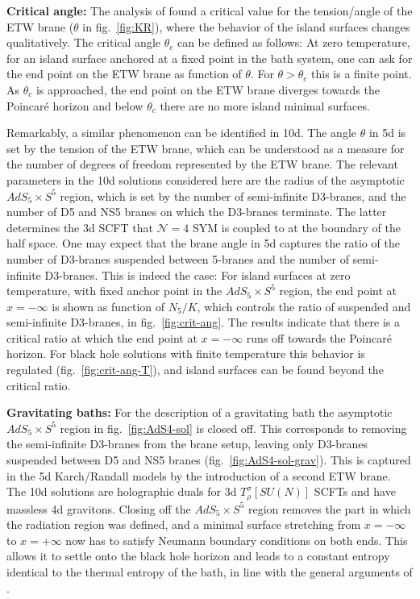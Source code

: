 \documentclass[aps,prd,11pt,notitlepage,longbibliography,nofootinbib,tightenlines,preprintnumbers]{revtex4-1}
\begin{document}
\medskip
\textbf{Critical angle:}
The analysis of  \cite{Geng:2020fxl} found a critical value for the tension/angle of the ETW brane ($\theta$ in fig.~\ref{fig:KR}), where the behavior of the island surfaces changes qualitatively.
%
The critical angle $\theta_c$ can be defined as follows:
At zero temperature, for an island surface anchored at a fixed point in the bath system, one can ask for the end point on the ETW brane as function of $\theta$. For $\theta>\theta_c$ this is a finite point.
As $\theta_c$ is approached, the end point on the ETW brane diverges towards the Poincar\'e horizon and below $\theta_c$ there are no more island minimal surfaces.

Remarkably, a similar phenomenon can be identified in 10d.
The angle $\theta$ in 5d is set by the tension of the ETW brane, which can be understood as a measure for the number of degrees of freedom represented by the ETW brane.
The relevant parameters in the 10d solutions considered here are the radius of the asymptotic $AdS_5\times S^5$ region, which is set by the number of semi-infinite D3-branes, and the number of D5 and NS5 branes on which the D3-branes terminate. 
The latter determines the 3d SCFT that $\mathcal N=4$ SYM is coupled to at the boundary of the half space.
One may expect that the brane angle in 5d captures the ratio of the number of D3-branes suspended between 5-branes and the number of semi-infinite D3-branes.
%
This is indeed the case: For island surfaces at zero temperature, with fixed anchor point in the $AdS_5\times S^5$ region, the end point at $x=-\infty$ is shown as function of $N_5/K$, which controls the ratio of suspended and semi-infinite D3-branes, in fig.~\ref{fig:crit-ang}.
The results indicate that there is a critical ratio at which the end point at $x=-\infty$ runs off towards the Poincar\'e horizon.
For black hole solutions with finite temperature this behavior is regulated (fig.~\ref{fig:crit-ang-T}), and island surfaces can be found  beyond the critical ratio.


\medskip
\textbf{Gravitating baths:} 
For the description of a gravitating bath the asymptotic $AdS_5\times S^5$ region in fig.~\ref{fig:AdS4-sol} is closed off. 
This corresponds to removing the semi-infinite D3-branes from the brane setup, leaving only D3-branes suspended between D5 and NS5 branes (fig.~\ref{fig:AdS4-sol-grav}). 
This is captured in the 5d Karch/Randall models by the introduction of a second ETW brane. 
The 10d solutions are holographic duals for 3d $T_\rho^\sigma[SU(N)]$ SCFTs \cite{Assel:2011xz} and have massless 4d gravitons.
Closing off the $AdS_5\times S^5$ region removes the part in which the radiation region was defined,
and a minimal surface stretching from $x=-\infty$ to $x=+\infty$ now has to satisfy Neumann boundary conditions on both ends. This allows it to settle onto the black hole horizon and  leads to a constant entropy identical to the thermal entropy of the bath, 
 in line with the general arguments of \cite{Laddha:2020kvp,Raju:2020smc}.
\end{document}
